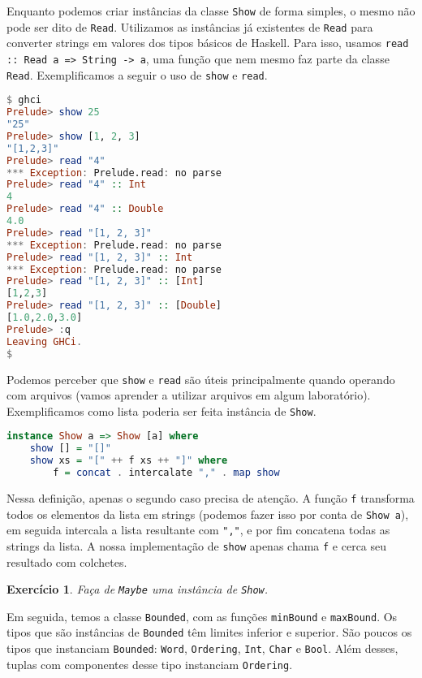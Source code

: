 \documentclass[a4paper]{article}
\newtheorem{exercicio}{Exercício}
\begin{document}
Enquanto podemos criar instâncias da classe \texttt{Show} de forma simples, o mesmo não pode ser dito de \texttt{Read}.
Utilizamos as instâncias já existentes de \texttt{Read} para converter strings em valores dos tipos básicos de Haskell.
Para isso, usamos \texttt{read :: Read a => String -> a}, uma função que nem mesmo faz parte da classe \texttt{Read}.
Exemplificamos a seguir o uso de \texttt{show} e \texttt{read}.

\begin{lstlisting}[language=haskell, frame=single]
$ ghci
Prelude> show 25
"25"
Prelude> show [1, 2, 3]
"[1,2,3]"
Prelude> read "4"
*** Exception: Prelude.read: no parse
Prelude> read "4" :: Int
4
Prelude> read "4" :: Double
4.0
Prelude> read "[1, 2, 3]"
*** Exception: Prelude.read: no parse
Prelude> read "[1, 2, 3]" :: Int
*** Exception: Prelude.read: no parse
Prelude> read "[1, 2, 3]" :: [Int]
[1,2,3]
Prelude> read "[1, 2, 3]" :: [Double]
[1.0,2.0,3.0]
Prelude> :q
Leaving GHCi.
$
\end{lstlisting}

Podemos perceber que \texttt{show} e \texttt{read} são úteis principalmente quando operando com arquivos (vamos aprender a utilizar arquivos em algum laboratório).
Exemplificamos como lista poderia ser feita instância de \texttt{Show}.

\begin{lstlisting}[language=haskell, frame=single]
instance Show a => Show [a] where
	show [] = "[]"
	show xs = "[" ++ f xs ++ "]" where
		f = concat . intercalate "," . map show
\end{lstlisting}

Nessa definição, apenas o segundo caso precisa de atenção.
A função \texttt{f} transforma todos os elementos da lista em strings (podemos fazer isso por conta de \texttt{Show a}), em seguida intercala a lista resultante com \texttt{","}, e por fim concatena todas as strings da lista.
A nossa implementação de \texttt{show} apenas chama \texttt{f} e cerca seu resultado com colchetes.

\begin{exercicio}
	Faça de \emph{\texttt{Maybe}} uma instância de \emph{\texttt{Show}}.
\end{exercicio}

Em seguida, temos a classe \texttt{Bounded}, com as funções \texttt{minBound} e \texttt{maxBound}.
Os tipos que são instâncias de \texttt{Bounded} têm limites inferior e superior.
São poucos os tipos que instanciam \texttt{Bounded}: \texttt{Word}, \texttt{Ordering}, \texttt{Int}, \texttt{Char} e \texttt{Bool}.
Além desses, tuplas com componentes desse tipo instanciam \texttt{Ordering}.
\end{document}
